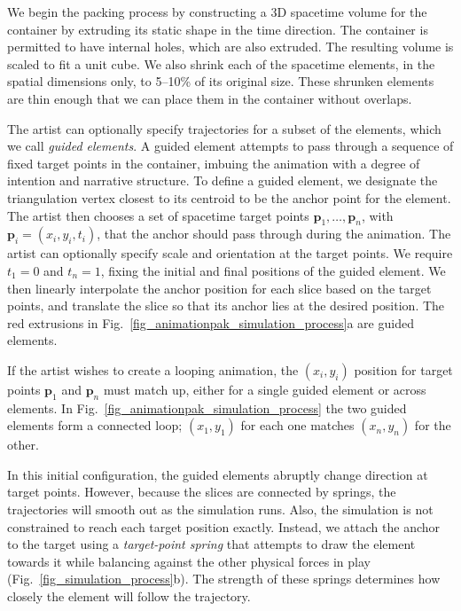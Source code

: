 We begin the packing process by constructing a 3D spacetime volume for
the container by extruding its static shape in
the time direction.  The container is 
permitted to have internal holes, which are also extruded.  
The resulting volume is scaled to fit a unit cube.
We also shrink each of the spacetime elements, in the spatial dimensions
only, to 5--10\% of its original size.  These shrunken elements are 
thin enough that we can place them in the container without overlaps.


The artist can optionally specify 
trajectories for a subset of the elements, which we call \textit{guided
elements}.  A guided element attempts to pass through a sequence
of fixed target points in the container,
imbuing the animation with a degree
of intention and narrative structure.  To define a guided element,
we designate the triangulation vertex closest to its centroid
to be the anchor point for the element.  The artist then
chooses a set of spacetime target points $\bm{p}_1,\ldots,\bm{p}_n$,
with $\bm{p}_i=(x_i,y_i,t_i)$, that the anchor should pass through
during the animation.  
The artist can  optionally specify scale and
orientation at the target points. We require $t_1=0$ and $t_n=1$,
fixing the initial and final positions of the guided element.  
We then linearly interpolate the anchor position
for each slice based on the target points, and translate the slice
so that its anchor lies at the desired position.  The red extrusions
in Fig.~\ref{fig_animationpak_simulation_process}a are guided elements.

If the artist wishes to create a looping animation, the $(x_i,y_i)$ position
for target points $\bm{p}_1$ and $\bm{p}_n$ must match up, either
for a single guided element or across elements. In
Fig.~\ref{fig_animationpak_simulation_process} the two guided elements form a connected
loop; $(x_1,y_1)$ for each one matches $(x_n,y_n)$ for the other.

In this initial configuration, the guided elements abruptly change
direction at target points.  However, because the slices are connected
by springs, the trajectories will smooth out as the 
simulation runs. Also, the simulation is not constrained to reach
each target position exactly.  Instead, we attach the
anchor to the target using a \textit{target-point spring} that
attempts to draw the element towards it while balancing against
the other physical forces in play (Fig.~\ref{fig_simulation_process}b).
The strength of these springs determines how closely the element
will follow the trajectory.

